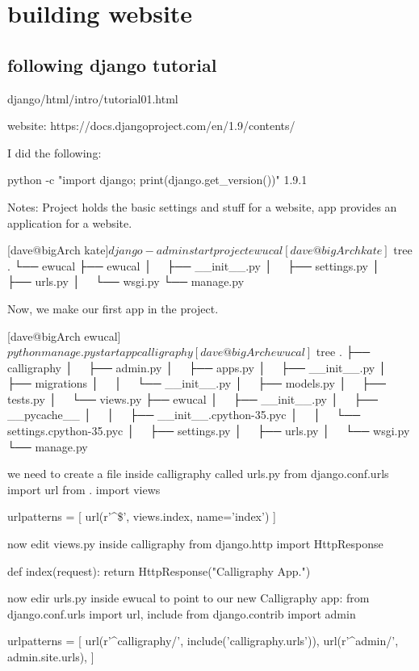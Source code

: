 \chapter{building website}

\section{following django tutorial}

django/html/intro/tutorial01.html

website: https://docs.djangoproject.com/en/1.9/contents/

I did the following:


python -c "import django; print(django.get_version())"
1.9.1

Notes:  Project holds the basic settings and stuff for a website,  app provides an application for a website.


[dave@bigArch kate]$ django-admin startproject ewucal
[dave@bigArch kate]$ tree
.
└── ewucal
    ├── ewucal
    │   ├── __init__.py
    │   ├── settings.py
    │   ├── urls.py
    │   └── wsgi.py
    └── manage.py

    Now, we make our first app in the project.
    
[dave@bigArch ewucal]$ python manage.py startapp calligraphy
[dave@bigArch ewucal]$ tree
.
├── calligraphy
│   ├── admin.py
│   ├── apps.py
│   ├── __init__.py
│   ├── migrations
│   │   └── __init__.py
│   ├── models.py
│   ├── tests.py
│   └── views.py
├── ewucal
│   ├── __init__.py
│   ├── __pycache__
│   │   ├── __init__.cpython-35.pyc
│   │   └── settings.cpython-35.pyc
│   ├── settings.py
│   ├── urls.py
│   └── wsgi.py
└── manage.py

we need to create a file inside calligraphy called urls.py
from django.conf.urls import url
from . import views

urlpatterns = [
    url(r'^\$', views.index, name='index')
]


now edit views.py inside calligraphy
from django.http import HttpResponse

def index(request):
    return HttpResponse("Calligraphy App.")
   
now edir urls.py inside ewucal to point to our new Calligraphy app:
from django.conf.urls import url, include
from django.contrib import admin

urlpatterns = [
    url(r'^calligraphy/', include('calligraphy.urls')),
    url(r'^admin/', admin.site.urls),
]


